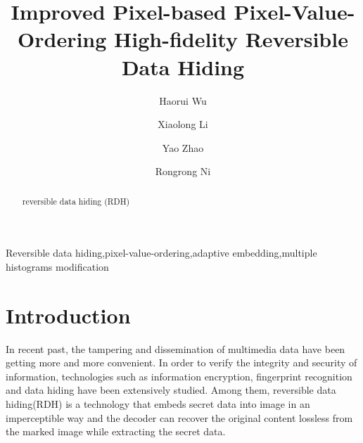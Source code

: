 \documentclass[review,3p,10pt,sort&compress]{elsarticle}
\begin{document}
\begin{frontmatter}

\title {Improved Pixel-based Pixel-Value-Ordering High-fidelity Reversible Data Hiding}

\author{Haorui Wu}

\author{Xiaolong Li}

\author{Yao Zhao}

\author{Rongrong Ni}

\address[mymainaddress]{Institute of Information Science, Beijing Jiaotong University, Beijing 100044, China}
\address[mysecondaryaddress]{Beijing Key Laboratory of Advanced Information Science and Network Technology, Beijing 100044, China}

\begin{abstract}
reversible data hiding (RDH)
\end{abstract}


\begin{keyword}
   Reversible data hiding\sep pixel-value-ordering\sep adaptive embedding\sep multiple histograms modification
\end{keyword}

\end{frontmatter}

\section{Introduction}\label{sec:1}
In recent past, the tampering and dissemination of multimedia data have been getting more and more convenient. In order to verify the integrity and security of information, technologies such as information encryption, fingerprint recognition and data hiding have been extensively studied. Among them, reversible data hiding(RDH) is a technology that embeds secret data into image in an imperceptible way and the decoder can recover the original content lossless from the marked image while extracting the secret data.
\end{document}
